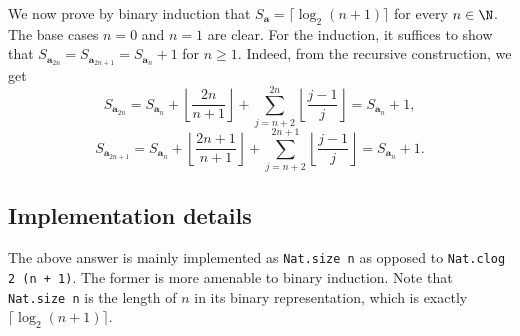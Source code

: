 We now prove by binary induction that $S_{\mathbf{a}} = \lceil \log_2 (n + 1) \rceil$ for every $n \in \N$.
The base cases $n = 0$ and $n = 1$ are clear.
For the induction, it suffices to show that $S_{\mathbf{a}_{2n}} = S_{\mathbf{a}_{2n + 1}} = S_{\mathbf{a}_n} + 1$ for $n \geq 1$.
Indeed, from the recursive construction, we get
\[ S_{\mathbf{a}_{2n}} = S_{\mathbf{a}_n} + \left\lfloor \frac{2n}{n + 1} \right\rfloor + \sum_{j = n + 2}^{2n} \left\lfloor \frac{j - 1}{j} \right\rfloor = S_{\mathbf{a}_n} + 1, \]
\[ S_{\mathbf{a}_{2n + 1}} = S_{\mathbf{a}_n} + \left\lfloor \frac{2n + 1}{n + 1} \right\rfloor + \sum_{j = n + 2}^{2n + 1} \left\lfloor \frac{j - 1}{j} \right\rfloor = S_{\mathbf{a}_n} + 1. \]



\subsection*{Implementation details}

The above answer is mainly implemented as \texttt{Nat.size n} as opposed to \texttt{Nat.clog 2 (n + 1)}.
The former is more amenable to binary induction.
Note that \texttt{Nat.size n} is the length of $n$ in its binary representation, which is exactly $\lceil \log_2 (n + 1) \rceil$.

